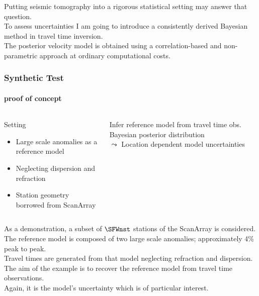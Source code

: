 \documentclass[aspectratio=169, t, 10pt,
    ]{beamer}
\begin{document}
Putting seismic tomography into a rigorous statistical setting may answer that question.
\\
To assess uncertainties I am going to introduce a consistently derived Bayesian method in travel time inversion.
\\
The posterior velocity model is obtained using a correlation-based and non-parametric approach at ordinary computational costs.


\begin{frame}
    \frametitle{Synthetic Test}
    \framesubtitle{proof of concept}%
%
\begin{columns}%
%
%

    \begin{exampleblock}{Setting}
        \begin{itemize}
            \item Large scale anomalies as a reference model
            \item Neglecting dispersion and refraction
            \item Station geometry borrowed from ScanArray
        \end{itemize}
    \end{exampleblock}
    \medskip

    \begin{alertblock}{Infer reference model from travel time obs.}
        Bayesian posterior distribution \\
        \hfill {\large $\leadsto$} Location dependent model uncertainties ~
    \end{alertblock}

    \vspace{-10mm}
    
\end{columns}

\end{frame}

As a demonstration, a subset of $\SFWnst$ stations of the ScanArray is considered.
\\
The reference model is composed of two large scale anomalies; approximately 4\% peak to peak.
\\
Travel times are generated from that model neglecting refraction and dispersion.
\\
The aim of the example is to recover the reference model from travel time observations.
\\
Again, it is the model's uncertainty which is of particular interest.
\end{document}
